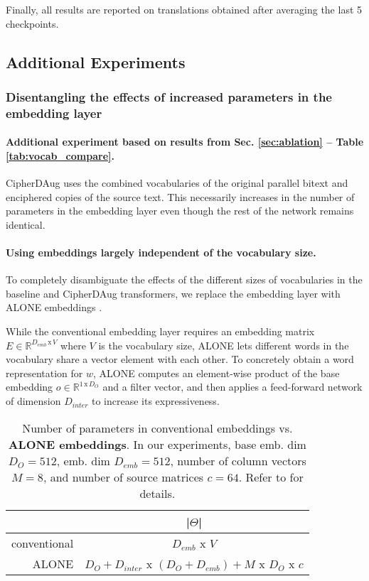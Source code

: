 \documentclass[11pt]{article}
\begin{document}
Finally, all results are reported on translations obtained after averaging the last 5 checkpoints.


\subsection{Additional Experiments}

\subsubsection{Disentangling the effects of increased parameters in the embedding layer}

\paragraph{Additional experiment based on results from Sec. \ref{sec:ablation} -- Table \ref{tab:vocab_compare}.}CipherDAug uses the combined vocabularies of the original parallel bitext and enciphered copies of the source text. This necessarily increases in the number of parameters in the embedding layer even though the rest of the network remains identical. 


\paragraph{Using embeddings largely independent of the vocabulary size.} To completely disambiguate the effects of the different sizes of vocabularies in the baseline and CipherDAug transformers, we replace the embedding layer with ALONE embeddings \cite{alone-neurips20}.

While the conventional embedding layer requires an embedding matrix $E \in \mathbb{R}^{D_{emb}\,\text{x}\, V}$ where $V$ is the vocabulary size, ALONE lets different words in the vocabulary share a vector element with each other. To concretely obtain a word representation for $w$, ALONE computes an element-wise product of the base embedding $o \in \mathbb{R}^{1\,\text{x}\,D_{O}}$  and a filter vector, and then applies a feed-forward network of dimension $D_{inter}$ to increase its expressiveness. 

\begin{table}[ht]
\scriptsize
\centering
\begin{tabular}{rc}
\toprule
 & \textbf{|$\Theta$|} \\ \midrule
conventional &  $D_{emb}$ x $V$ \\
ALONE & $D_O + D_{inter}$ x $(D_O + D_{emb}) + M$ x $D_O$ x $c$ \\
\bottomrule
\end{tabular}
\caption{Number of parameters in conventional embeddings vs. \textbf{ALONE embeddings}. In our experiments, base emb. dim $D_O = 512$, emb. dim $D_{emb} = 512$, number of column vectors $M = 8$, and number of source matrices $c = 64$. Refer to \citet{alone-neurips20} for details.}
\label{tab:alone_details}
\end{table}
\end{document}
